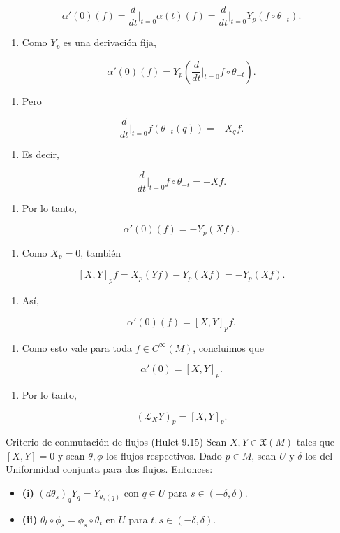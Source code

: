 \begin{bookproof}{}
\[
\alpha'(0)(f)=\frac{d}{dt}\bigg|_{t=0}\alpha(t)(f)=\frac{d}{dt}\bigg|_{t=0}Y_p(f\circ\theta_{-t}).
\]
\begin{enumerate}[start=29]
\item Como $Y_p$ es una derivación fija,
\end{enumerate}
\[
\alpha'(0)(f)=Y_p\left(\frac{d}{dt}\bigg|_{t=0}f\circ\theta_{-t}\right).
\]
\begin{enumerate}[start=30]
\item Pero
\end{enumerate}
\[
\frac{d}{dt}\bigg|_{t=0}f(\theta_{-t}(q))=-X_qf.
\]
\begin{enumerate}[start=31]
\item Es decir,
\end{enumerate}
\[
\frac{d}{dt}\bigg|_{t=0}f\circ\theta_{-t}=-Xf.
\]
\begin{enumerate}[start=32]
\item Por lo tanto,
\end{enumerate}
\[
\alpha'(0)(f)=-Y_p(Xf).
\]
\begin{enumerate}[start=33]
\item Como $X_p=0$, también
\end{enumerate}
\[
[X,Y]_pf=X_p(Yf)-Y_p(Xf)=-Y_p(Xf).
\]
\begin{enumerate}[start=34]
\item Así,
\end{enumerate}
\[
\alpha'(0)(f)=[X,Y]_pf.
\]
\begin{enumerate}[start=35]
\item Como esto vale para toda $f\in C^\infty(M)$, concluimos que
\end{enumerate}
\[
\alpha'(0)=[X,Y]_p.
\]
\begin{enumerate}[start=36]
\item Por lo tanto,
\end{enumerate}
\[
(\mathcal L_XY)_p=[X,Y]_p.
\]
\bookqed
\end{bookproof}
\begin{bookproposition}{Criterio de conmutación de flujos (Hulet 9.15)}
Sean $X,Y\in\mathfrak X(M)$ tales que $[X,Y]=0$ y sean $\theta,\phi$ los flujos respectivos. Dado $p\in M$, sean $U$ y $\delta$ los del \hyperref[blk:39cc9a]{Uniformidad conjunta para dos flujos}. Entonces:

\begin{itemize}
\item \textbf{(i)} $(d\theta_s)_qY_q=Y_{\theta_s(q)}$ con $q\in U$ para $s\in(-\delta,\delta)$.
\item \textbf{(ii)} $\theta_t\circ\phi_s=\phi_s\circ\theta_t$ en $U$ para $t,s\in(-\delta,\delta)$.
\end{itemize}
\end{bookproposition}
